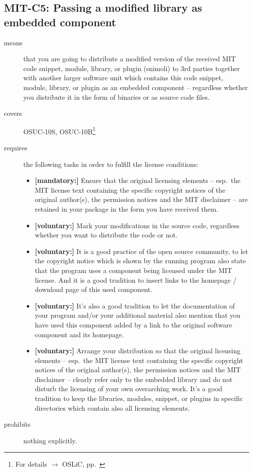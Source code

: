 \subsection{MIT-C5: Passing a modified library as embedded component}
\label{OSUC-10S-MIT}\label{OSUC-10B-MIT}
\begin{description}
\item[means] that you are going to distribute a modified version of the received
MIT code snippet, module, library, or plugin (snimoli) to 3rd parties together
with another larger software unit which contains this code snippet, module,
library, or plugin as an embedded component -- regardless whether you distribute
it in the form of binaries or as source code files.

\item[covers] OSUC-10S, OSUC-10B\footnote{For details $\rightarrow$ OSLiC, pp.\
\pageref{OSUC-10S-DEF}}
\item[requires] the following tasks in order to fulfill the license conditions:
\begin{itemize}
  \item \textbf{[mandatory:]} Ensure that the original licensing elements -- esp.\
  the MIT license text containing the specific copyright notices of the original
  author(s), the permission notices and the MIT disclaimer -- are retained in
  your package in the form you have received them.
  \item \textbf{[voluntary:]} Mark your modifications in the source code,
  regardless whether you want to distribute the code or not.
  
  \item \textbf{[voluntary:]} It is a good practice of the open source
  community, to let the copyright notice which is shown by the running program
  also state that the program uses a component being licensed under the MIT
  license. And it is a good tradition to insert links to the homepage / download
  page of this used component.

  \item \textbf{[voluntary:]} It's also a good tradition to let the
  documentation of your program and/or your additional material also mention
  that you have used this component added by a link to the original software
  component and its homepage.
  
  \item \textbf{[voluntary:]} Arrange your distribution so that the original
  licensing elements -- esp.\ the MIT license text containing the specific
  copyright notices of the original author(s), the permission notices and the
  MIT disclaimer --  clearly refer only to the embedded library and do not
  disturb the licensing of your own overarching work. It's a good tradition to
  keep the libraries, modules, snippet, or plugins in specific directories which
  contain also all licensing elements.
  
\end{itemize}
\item[prohibits] nothing explicitly.
\end{description}

